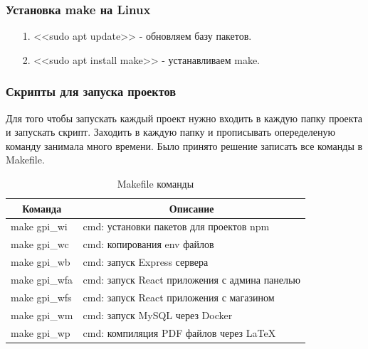 
\subsubsection*{Установка make на Linux}

\begin{itemize}
    \item[1.] <<sudo apt update>> - обновляем базу пакетов.
    \item[2.] <<sudo apt install make>> - устанавливаем make.
\end{itemize}

\newpage


\subsubsection*{Скрипты для запуска проектов}

Для того чтобы запускать каждый проект нужно входить в каждую папку проекта и запускать скрипт.
Заходить в каждую папку и прописывать опеределеную команду занимала много времени.
Было принято решение записать все команды в Makefile.

\begin{table}[!h]
    \centering
    \caption{Makefile команды}
    \begin{tabular}{|p{4cm}|p{12cm}|}

                                                                                   \hline
\multicolumn{1}{|c|}{\textbf{Команда}} & \multicolumn{1}{c|}{\textbf{Описание}} \\ \hline
make gpi\_wi    & cmd: установки пакетов для проектов npm                       \\ \hline 
make gpi\_wc    & cmd: копирования env файлов                                   \\ \hline  
make gpi\_wb    & cmd: запуск Express сервера                                   \\ \hline
make gpi\_wfa   & cmd: запуск React приложения с админа панелью                 \\ \hline
make gpi\_wfs   & cmd: запуск React приложения с магазином                      \\ \hline
make gpi\_wm    & cmd: запуск MySQL через Docker                                \\ \hline
make gpi\_wp    & cmd: компиляция PDF файлов через LaTeX                        \\ \hline

    \end{tabular}
\end{table}

